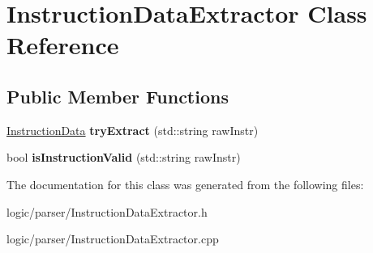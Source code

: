 \hypertarget{classInstructionDataExtractor}{}\section{Instruction\+Data\+Extractor Class Reference}
\label{classInstructionDataExtractor}
\subsection*{Public Member Functions}
\begin{DoxyCompactItemize}
\item 
\mbox{\label{classInstructionDataExtractor_a82bf23dcb5d0204a28745baee314d893}} 
\hyperlink{classInstructionData}{Instruction\+Data} {\bfseries try\+Extract} (std\+::string raw\+Instr)
\item 
\mbox{\label{classInstructionDataExtractor_ad6f18216556a97b60018d4af6c5e8d8f}} 
bool {\bfseries is\+Instruction\+Valid} (std\+::string raw\+Instr)
\end{DoxyCompactItemize}


The documentation for this class was generated from the following files\+:\begin{DoxyCompactItemize}
\item 
logic/parser/Instruction\+Data\+Extractor.\+h\item 
logic/parser/Instruction\+Data\+Extractor.\+cpp\end{DoxyCompactItemize}
